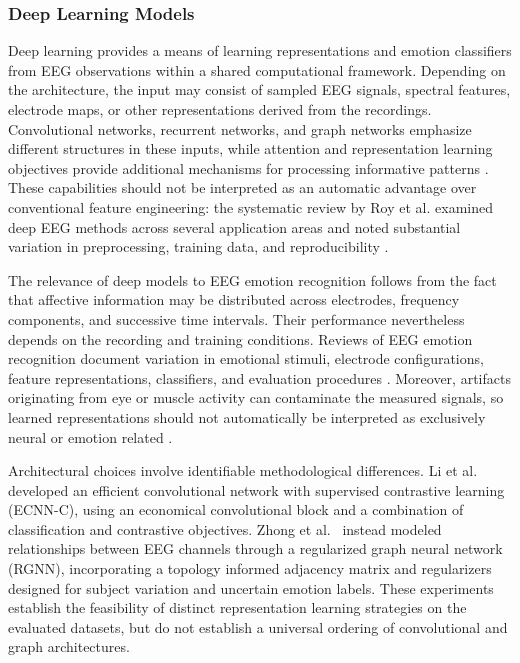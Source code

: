 \documentclass[ASNA,twocolumn]{USG}
\begin{document}
\subsubsection{Deep Learning Models}
\label{sec:deep_learning_models}

Deep learning provides a means of learning representations and emotion classifiers from EEG observations within a shared computational framework. Depending on the architecture, the input may consist of sampled EEG signals, spectral features, electrode maps, or other representations derived from the recordings. Convolutional networks, recurrent networks, and graph networks emphasize different structures in these inputs, while attention and representation learning objectives provide additional mechanisms for processing informative patterns \cite{roy2019deep,zhong2020eeg}. These capabilities should not be interpreted as an automatic advantage over conventional feature engineering: the systematic review by Roy et al. examined deep EEG methods across several application areas and noted substantial variation in preprocessing, training data, and reproducibility \cite{roy2019deep}.

The relevance of deep models to EEG emotion recognition follows from the fact that affective information may be distributed across electrodes, frequency components, and successive time intervals. Their performance nevertheless depends on the recording and training conditions. Reviews of EEG emotion recognition document variation in emotional stimuli, electrode configurations, feature representations, classifiers, and evaluation procedures \cite{suhaimi2020eeg}. Moreover, artifacts originating from eye or muscle activity can contaminate the measured signals, so learned representations should not automatically be interpreted as exclusively neural or emotion related \cite{lai2018artifacts}.

Architectural choices involve identifiable methodological differences. Li et al.~\cite{li2022eeg} developed an efficient convolutional network with supervised contrastive learning (ECNN-C), using an economical convolutional block and a combination of classification and contrastive objectives. Zhong et al.~\cite{zhong2020eeg} instead modeled relationships between EEG channels through a regularized graph neural network (RGNN), incorporating a topology informed adjacency matrix and regularizers designed for subject variation and uncertain emotion labels. These experiments establish the feasibility of distinct representation learning strategies on the evaluated datasets, but do not establish a universal ordering of convolutional and graph architectures.
\end{document}
